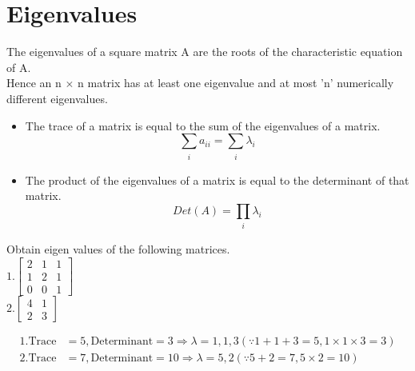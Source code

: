\section{Eigenvalues}
The eigenvalues of a square matrix A are the roots of the characteristic equation
 of A.\\
Hence an n $\times$ n matrix has at least one eigenvalue and at most 'n' numerically
different eigenvalues.
\begin{note}
	\begin{itemize}
		\item 	 The trace of a matrix is equal to the sum of the
		eigenvalues of a matrix.
		\[
		\sum_{\substack{i }} a_{ii}=\sum_{\substack{i }} \lambda_{i}
		\]
		\item The product of the eigenvalues of a matrix is equal
		to the determinant of that matrix.
		\[
		Det(A)=\prod_{\substack{i }} \lambda_{i}
		\]
		
	\end{itemize}
	
\end{note}
\begin{exercise}
	Obtain eigen values of the following matrices.\\$1.\left[\begin{array}{ccc}2 & 1 & 1\\ 1 & 2 & 1\\ 0 & 0& 1\end{array}\right]$\\$2.\left[\begin{array}{cc}4 & 1 \\ 2 & 3\end{array}\right]$
\end{exercise}
\begin{answer}
	$$
	\begin{aligned}
		1.\text{Trace}&=5, \text{Determinant}=3\Longrightarrow \lambda=1,1,3(\because 1+1+3=5,1\times1\times3=3)\\
		2.\text{Trace}&=7, \text{Determinant}=10\Longrightarrow \lambda=5,2(\because 5+2=7,5\times2=10)	
	\end{aligned}$$
 
\end{answer}



